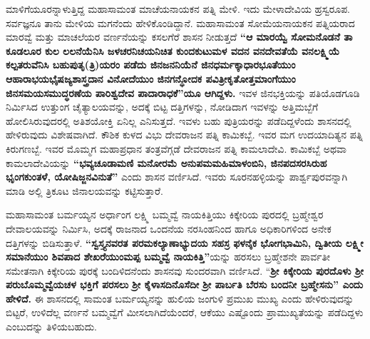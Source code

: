ಮಾಳಿಗೆಯೂರನ್ನಾಳುತ್ತಿದ್ದ ಮಹಾಸಾಮಂತ ಮಾಚೆಯನಾಯಕನ ಪತ್ನಿ ಮೇಳಿ. ಇದು ಮೇಳಾದೇವಿಯ ಹ್ರಸ್ವರೂಪ. ಸರ್ವಜ್ಞನೂ ತಾನು ಮೇಳಿಯ ಮಗನೆಂದು ಹೇಳಿಕೊಂಡಿದ್ದಾನೆ. ಮಹಾಸಾಮಂತ ಸೋಮೆಯನಾಯಕನ ಪತ್ನಿಯರಾದ ಮಾರವ್ವೆ ಮತ್ತು ಮಾಚಲೆಯರ ವರ್ಣನೆಯನ್ನು ಕಸಲಗೆರೆ ಶಾಸನ ನೀಡುತ್ತದೆ \textbf{“ಆ ಮಾರಯ್ವೆ ಸೋಮನೊಡನೆ ತಾ ಕೂಡಲೂರ ಕುಲ ಲಲನೆಯೆನಿಸಿ ಜಳಚರನಿಚಯನಿಚಿತ ಕುಂದಕುಟುಮಳ ವದನ ವನದೇವತೆಯೆ ವನಲಕ್ಷ್ಮಿಯೆ ಕಲ್ಪತರುವೆನಿಸಿ ಬಹುಪುತೃ(ತ್ರಿ)ಯರಂ ಪಡೆದು ಜಿನಜನನಿಯೆನೆ ಜಿನಧರ್ಮಕ್ಕಾಧಾರಭೂತೆಯುಂ ಆಹಾರಾಭಯಭೈಷಜ್ಯಶಾಸ್ತ್ರದಾನ\general{\break } ವಿನೋದೆಯುಂ ಜಿನಗನ್ಧೋದಕ ಪವಿತ್ರೀಕೃತೋತ್ತಮಾಂಗೆಯುಂ ಜಿನಸಮಯಸಮುದ್ಧರಣೆಯ ಪಾರಿಶ್ವದೇವ ಪಾದಾ\general{\break }ರಾಧಕೆ”ಯೂ ಆಗಿದ್ದಳು. }ಇವಳ ಜಿನಭಕ್ತಿಯನ್ನು ಪತಿಯೊಡಗೂಡಿ ನಿರ್ಮಿಸಿದ ಉತ್ತುಂಗ ಚೈತ್ಯಾಲಯವನ್ನು, ಅದಕ್ಕೆ ಬಿಟ್ಟ ದತ್ತಿಗಳನ್ನು, ನೋಡಿದಾಗ ಇವಳನ್ನು ಅತ್ತಿಮಬ್ಬೆಗೆ ಹೋಲಿಸಿರುವುದರಲ್ಲಿ ಅತಿಶಯೋಕ್ತಿ ಏನಿಲ್ಲ ಎನಿಸುತ್ತದೆ. ಇವಳು ಬಹು ಪುತ್ರಿಯರನ್ನು ಪಡೆದಿದ್ದಳೆಂದು ಶಾಸನದಲ್ಲಿ ಹೇಳಿರುವುದು ವಿಶೇಷವಾಗಿದೆ. ಕೌಶಿಕ ಕುಳದ ವಿಭು ದೇವರಾಜನ ಪತ್ನಿ ಕಾಮಿಕಬ್ಬೆ. ಇವರ ಮಗ ಉದಯಾದಿತ್ಯನ ಪತ್ನಿ ಕಿರುಗಣಬ್ಬೆ. ಇವರ ಮೊಮ್ಮಗ ಮಹಾಪ್ರಧಾನ ತಂತ್ರವೆಗ್ಗಡೆ ದೇವರಾಜನ ಪತ್ನಿ ಕಾಮಲಾದೇವಿ. ಕಾಮಿಕಬ್ಬೆ ಅಥವಾ ಕಾಮಲಾದೇವಿಯನ್ನು \textbf{“ಭವ್ಯಚೂಡಾಮಣಿ ಮನೋರಮೆ ಅನುಪಮಮಹಿಮಾಳಂಬಿನಿ, ಜಿನಪದಸರಸಿರುಹ ಭೃಂಗಕುಂತಳೆ, ಯೋಷಿಜ್ಜನವಿನುತೆ”} ಎಂದು ಶಾಸನ ವರ್ಣಿಸಿದೆ. ಇವರು ಸೂರನಹಳ್ಳಿಯನ್ನು ಪಾರ್ಶ್ವಪುರವನ್ನಾಗಿ ಮಾಡಿ ಅಲ್ಲಿ ತ್ರಿಕೂಟ ಜಿನಾಲಯವನ್ನು ಕಟ್ಟಿಸುತ್ತಾರೆ.

ಮಹಾಸಾಮಂತ ಬರ್ಮಯ್ಯನ ಅರ್ಧಾಂಗ ಲಕ್ಷ್ಮಿ ಬಮ್ಮವ್ವೆ ನಾಯಕಿತ್ತಿಯು ಕಿಕ್ಕೇರಿಯ ಪುರದಲ್ಲಿ ಬ್ರಹ್ಮೇಶ್ವರ ದೇವಾಲಯವನ್ನು ನಿರ್ಮಿಸಿ, ಅದಕ್ಕೆ ರಾಜನಾದ ಒಂದನೆಯ ನರಸಿಂಹನಿಂದ ಹಾಗೂ ಅಧಿಕಾರಿಗಳಿಂದ ಅನೇಕ ದತ್ತಿಗಳನ್ನು ಬಿಡಿಸುತ್ತಾಳೆ.\textbf{ “ಸ್ವಸ್ತ್ಯನವರತ ಪರಮಕಲ್ಯಾಣಾಭ್ಯುದಯ ಸಹಸ್ರ ಫಳನೈಕ ಭೋಗಭಾಮಿನಿ, ದ್ವಿತೀಯ ಲಕ್ಷ್ಮೀ ಸಮಾನೆಯುಂ ಶಿವಪಾದ ಶೇಖರೆಯುಂಮಪ್ಪ ಬಮ್ಮವ್ವೆ ನಾಯಕಿತ್ತಿ”}ಯನ್ನು ಹರಸಲು ಬ್ರಹ್ಮೇಶನೇ ಪಾರ್ವತೀ ಸಮೇತನಾಗಿ ಕಿಕ್ಕೇರಿಯ ಪುರಕ್ಕೆ ಬಂದಿಳಿದನೆಂದು ಶಾಸನವು ಸುಂದರವಾಗಿ ವರ್ಣಿಸಿದೆ. “\textbf{ಶ‍್ರೀ ಕಿಕ್ಕೇರಿಯ ಪುರದೊಳು ಶ‍್ರೀ ಪರುಬೊಮ್ಮವ್ವೆಯಚಳ ಭಕ್ತಿಗೆ ಪರಸಲು} \textbf{ಶ‍್ರೀ ಕೈಳಾಸದಿನೊಸೆದೀ} \textbf{ಶ‍್ರೀ ಪಾರ್ಬತಿ ಬೆರಸು ಬಂದನೀ ಬ್ರಹ್ಮೇಸನು” ಎಂದು ಹೇಳಿದೆ. }ಈ ಶಾಸನದಲ್ಲಿ ಸಾಮಂತ ಬರ್ಮಯ್ಯನನ್ನು ಹುಲಿಯ ಜಂಗುಳಿ ಪ್ರಮುಖ ಮುಖ್ಯ ಎಂದು ಹೇಳಿರುವುದನ್ನು ಬಿಟ್ಟರೆ, ಉಳಿದೆಲ್ಲ ವರ್ಣನೆ ಬಮ್ಮವ್ವೆಗೆ ಮೀಸಲಾಗಿದೆಯೆಂದರೆ, ಆಕೆಯು ಎಷ್ಟೊಂದು ಪ್ರಾಮುಖ್ಯತೆಯನ್ನು ಪಡೆದಿದ್ದಳು ಎಂಬುದನ್ನು ತಿಳಿಯಬಹುದು.


